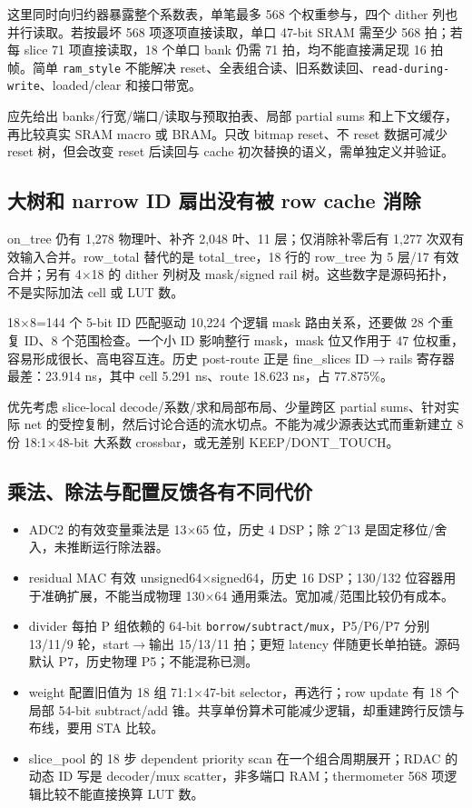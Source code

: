 \documentclass[UTF8,fontset=fandol,10pt,a4paper,openany]{ctexrep}
\newcommand{\code}[1]{\nolinkurl{#1}}
\begin{document}
这里同时向归约器暴露整个系数表，单笔最多 568 个权重参与，四个 dither 列也并行读取。若按最坏 568 项逐项直接读取，单口 47-bit SRAM 需至少 568 拍；若每 slice 71 项直接读取，18 个单口 bank 仍需 71 拍，均不能直接满足现 16 拍帧。简单 \code{ram_style} 不能解决 reset、全表组合读、旧系数读回、\code{read-during-write}、loaded/clear 和接口带宽。


应先给出 banks/行宽/端口/读取与预取拍表、局部 partial sums 和上下文缓存，再比较真实 SRAM macro 或 BRAM。只改 bitmap reset、不 reset 数据可减少 reset 树，但会改变 reset 后读回与 cache 初次替换的语义，需单独定义并验证。


\subsection{大树和 narrow ID 扇出没有被 row cache 消除}


on\_tree 仍有 1,278 物理叶、补齐 2,048 叶、11 层；仅消除补零后有 1,277 次双有效输入合并。row\_total 替代的是 total\_tree，18 行的 row\_tree 为 5 层/17 有效合并；另有 4\ensuremath{\times}18 的 dither 列树及 mask/signed rail 树。这些数字是源码拓扑，不是实际加法 cell 或 LUT 数。


18\ensuremath{\times}8=144 个 5-bit ID 匹配驱动 10,224 个逻辑 mask 路由关系，还要做 28 个重复 ID、8 个范围检查。一个小 ID 影响整行 mask，mask 位又作用于 47 位权重，容易形成很长、高电容互连。历史 post-route 正是 fine\_slices ID\ensuremath{\rightarrow}rails 寄存器最差：23.914 ns，其中 cell 5.291 ns、route 18.623 ns，占 77.875\%。


优先考虑 slice-local decode/系数/求和局部布局、少量跨区 partial sums、针对实际 net 的受控复制，然后讨论合适的流水切点。不能为减少源表达式而重新建立 8 份 18:1\ensuremath{\times}48-bit 大系数 crossbar，或无差别 KEEP/DONT\_TOUCH。


\subsection{乘法、除法与配置反馈各有不同代价}


\begin{itemize}
\item ADC2 的有效变量乘法是 13\ensuremath{\times}65 位，历史 4 DSP；除 2\textasciicircum{}13 是固定移位/舍入，未推断运行除法器。
\item residual MAC 有效 unsigned64\ensuremath{\times}signed64，历史 16 DSP；130/132 位容器用于准确扩展，不能当成物理 130\ensuremath{\times}64 通用乘法。宽加减/范围比较仍有成本。
\item divider 每拍 P 组依赖的 64-bit \code{borrow/subtract/mux}，P5/P6/P7 分别 13/11/9 轮，start\ensuremath{\rightarrow}输出 15/13/11 拍；更短 latency 伴随更长单拍链。源码默认 P7，历史物理 P5；不能混称已测。
\item weight 配置旧值为 18 组 71:1\ensuremath{\times}47-bit selector，再选行；row update 有 18 个局部 54-bit subtract/add 锥。共享单份算术可能减少逻辑，却重建跨行反馈与布线，要用 STA 比较。
\item slice\_pool 的 18 步 dependent priority scan 在一个组合周期展开；RDAC 的动态 ID 写是 decoder/mux scatter，非多端口 RAM；thermometer 568 项逻辑比较不能直接换算 LUT 数。
\end{itemize}
\end{document}
